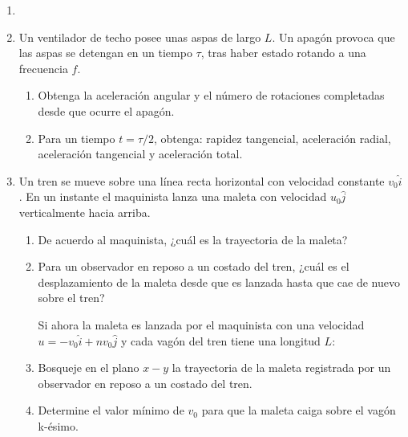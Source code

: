\documentclass[letterpaper,11pt]{article}
\begin{document}
\vspace{-1cm}
\begin{enumerate}\setlength{\itemsep}{0.4cm}


\item[]

\item Un ventilador de techo posee unas aspas de largo $L$. Un apagón provoca que las aspas se detengan en un tiempo $\tau$, tras haber estado rotando a una frecuencia $f$.

\begin{enumerate}
    \item Obtenga la aceleración angular y el número de rotaciones completadas desde que ocurre el apagón.
    
    \item Para un tiempo $t = \tau/2$, obtenga: rapidez tangencial, aceleración radial, aceleración tangencial y aceleración total.
\end{enumerate}

\item Un tren se mueve sobre una línea recta horizontal con velocidad constante $v_0\hat{i}$. En un instante el maquinista lanza una maleta con velocidad $u_0\hat{j}$ verticalmente hacia arriba.

    \begin{enumerate}
        \item De acuerdo al maquinista, ¿cuál es la trayectoria de la maleta?
        
        \item Para un observador en reposo a un costado del tren, ¿cuál es el desplazamiento de la maleta desde que es lanzada hasta que cae de nuevo sobre el tren?
    
    Si ahora la maleta es lanzada por el maquinista con una velocidad $u = -v_0\hat{i} + n v_0\hat{j}$ y cada vagón del tren tiene una longitud $L$:
    
        \item Bosqueje en el plano $x-y$ la trayectoria de la maleta registrada por un observador en reposo a un costado del tren.
        
        \item Determine el valor mínimo de $v_0$ para que la maleta caiga sobre el vagón k-ésimo.
        
    \end{enumerate}
    

\end{enumerate}
\end{document}
